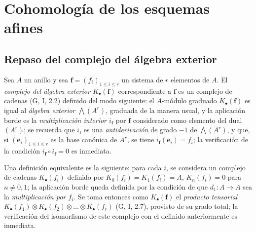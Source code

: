 \section{Cohomología de los esquemas afines}
\label{section:III.1}
\label{section:III.1-fr}

\subsection{Repaso del complejo del álgebra exterior}
\label{subsection:III.1.1}
\label{subsection:III.1.1-fr}

\begin{env}[1.1.1]
\label{III.1.1.1}
\label{III.1.1.1-fr}
Sea $A$ un anillo y sea $\mathbf f=(f_i)_{1\leq i\leq r}$ un sistema de $r$ elementos de $A$.
El \emph{complejo del álgebra exterior $K_\bullet(\mathbf f)$} correspondiente a $\mathbf f$ es un complejo de cadenas (G, I, 2.2) definido del modo siguiente: el $A$-módulo graduado $K_\bullet(\mathbf f)$ es igual al \emph{álgebra exterior $\bigwedge(A^r)$}, graduada de la manera usual, y la aplicación borde es la \emph{multiplicación interior $i_{\mathbf f}$} por $\mathbf f$ considerado como elemento del dual $(A^r)\check{}$; se recuerda que $i_{\mathbf f}$ es una \emph{antiderivación} de grado $-1$ de $\bigwedge(A^r)$, y que, si $(\mathbf e_i)_{1\leq i\leq r}$ es la base canónica de $A^r$, se tiene $i_{\mathbf f}(\mathbf e_i)=f_i$; la verificación de la condición $i_{\mathbf f}\circ i_{\mathbf f}=0$ es inmediata.

Una definición equivalente es la siguiente: para cada $i$, se considera un complejo de cadenas $K_\bullet(f_i)$ definido por $K_0(f_i)=K_1(f_i)=A$, $K_n(f_i)=0$ para $n\neq0,1$; la aplicación borde queda definida por la condición de que $d_1:A\to A$ sea la \emph{multiplicación por $f_i$}.
Se toma entonces como $K_\bullet(\mathbf f)$ el \emph{producto tensorial $K_\bullet(f_1)\otimes K_\bullet(f_2)\otimes\ldots\otimes K_\bullet(f_r)$} (G, I, 2.7), provisto de su grado total; la verificación del isomorfismo de este complejo con el definido anteriormente es inmediata.
\end{env}

